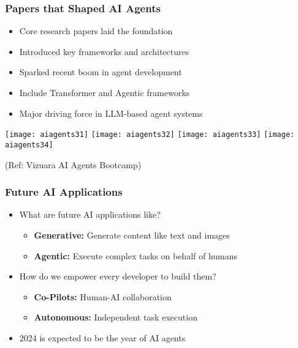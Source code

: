 \begin{frame}[fragile]\frametitle{Papers that Shaped AI Agents}

      \begin{itemize}
        \item Core research papers laid the foundation
        \item Introduced key frameworks and architectures
        \item Sparked recent boom in agent development
        \item Include Transformer and Agentic frameworks
        \item Major driving force in LLM-based agent systems
      \end{itemize}

		\begin{center}
		\texttt{[image: aiagents31]}
		\texttt{[image: aiagents32]}
		\texttt{[image: aiagents33]}
		\texttt{[image: aiagents34]}
		
		{\tiny (Ref: Vizuara AI Agents Bootcamp)}
		\end{center}	
 
\end{frame}


\begin{frame}[fragile]\frametitle{Future AI Applications}
\begin{itemize}
    \item What are future AI applications like?
    \begin{itemize}
        \item \textbf{Generative:} Generate content like text and images
        \item \textbf{Agentic:} Execute complex tasks on behalf of humans
    \end{itemize}
    \item How do we empower every developer to build them?
    \begin{itemize}
        \item \textbf{Co-Pilots:} Human-AI collaboration
        \item \textbf{Autonomous:} Independent task execution
    \end{itemize}
    \item 2024 is expected to be the year of AI agents
\end{itemize}
\end{frame}


